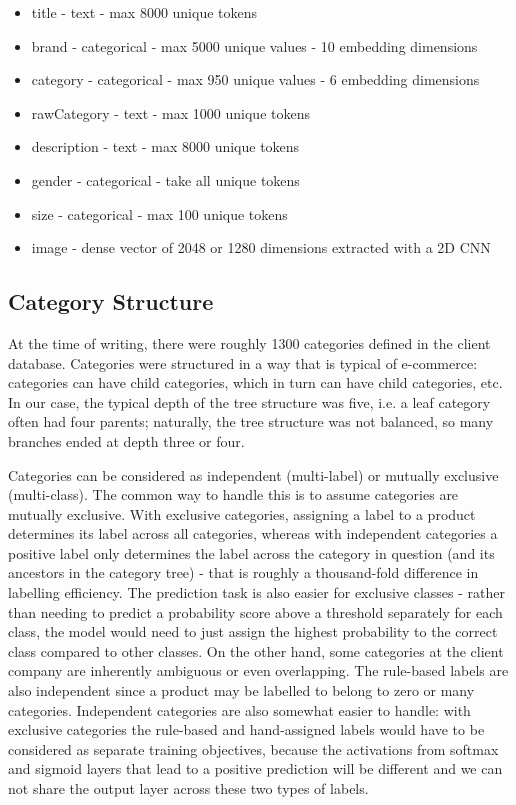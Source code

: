 \begin{itemize}[noitemsep]
  \item title - text - max 8000 unique tokens
  \item brand - categorical - max 5000 unique values - 10 embedding dimensions
  \item category - categorical - max 950 unique values - 6 embedding dimensions
  \item rawCategory - text - max 1000 unique tokens
  \item description - text - max 8000 unique tokens
  \item gender - categorical - take all unique tokens
  \item size - categorical - max 100 unique tokens
  \item image - dense vector of 2048 or 1280 dimensions extracted with a 2D CNN
\end{itemize}

\subsection{Category Structure}
\label{cat_tree}

At the time of writing, there were roughly 1300 categories defined in the client database.
Categories were structured in a way that is typical of  e-commerce:  categories can have  child categories, which in turn can have child categories, etc.
In our case, the typical depth of the tree structure was five, i.e. a leaf category often had four parents;  naturally, the tree structure was not balanced, so many branches ended at depth three or four.

Categories can be considered as independent (multi-label) or mutually exclusive (multi-class).
The common way to handle this is to assume categories are mutually exclusive.
With exclusive categories, assigning a label to a product determines its label across all categories, whereas with independent categories a positive label only determines the label across the category in question (and its ancestors in the category tree) - that is roughly a thousand-fold difference in labelling efficiency.
The prediction task is also easier for exclusive classes - rather than needing to predict a probability score above a threshold separately for each class, the model would need to just assign the highest probability to the correct class compared to other classes.
On the other hand, some categories at the client company are inherently ambiguous or even overlapping.
The rule-based labels are also independent since a product may be labelled to belong to zero or many categories.
Independent categories are also somewhat easier to handle: with exclusive categories the rule-based and hand-assigned labels would have to be considered as separate training objectives, because the activations from softmax and sigmoid layers that lead to a positive prediction will be different and we can not share the output layer across these two types of labels.


